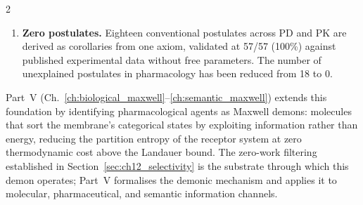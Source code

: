 \begin{multicols}{2}
\begin{enumerate}
\item \textbf{Zero postulates.} Eighteen conventional postulates across PD and PK are derived as corollaries from one axiom, validated at 57/57 (100\%) against published experimental data without free parameters. The number of unexplained postulates in pharmacology has been reduced from 18 to 0.

\end{enumerate}

Part~V (Ch.~\ref{ch:biological_maxwell}--\ref{ch:semantic_maxwell}) extends this foundation by identifying pharmacological agents as Maxwell demons: molecules that sort the membrane's categorical states by exploiting information rather than energy, reducing the partition entropy of the receptor system at zero thermodynamic cost above the Landauer bound. The zero-work filtering established in Section~\ref{sec:ch12_selectivity} is the substrate through which this demon operates; Part~V formalises the demonic mechanism and applies it to molecular, pharmaceutical, and semantic information channels.

\end{multicols}
